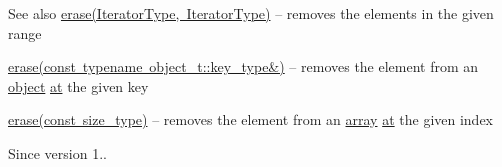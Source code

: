 \begin{DoxySeeAlso}{See also}
\mbox{\hyperlink{classnlohmann_1_1basic__json_a4b3f7eb2d4625d95a51fbbdceb7c5f39}{erase(\+Iterator\+Type, Iterator\+Type)}} -- removes the elements in the given range 

\mbox{\hyperlink{classnlohmann_1_1basic__json_a2f8484d69c55d8f2a9697a7bec29362a}{erase(const typename object\+\_\+t\+::key\+\_\+type\&)}} -- removes the element from an \mbox{\hyperlink{classnlohmann_1_1basic__json_a31f84ee15c4690ff705bed74736d04c6}{object}} \mbox{\hyperlink{classnlohmann_1_1basic__json_a73ae333487310e3302135189ce8ff5d8}{at}} the given key 

\mbox{\hyperlink{classnlohmann_1_1basic__json_a88cbcefe9a3f4d294bed0653550a5cb9}{erase(const size\+\_\+type)}} -- removes the element from an \mbox{\hyperlink{classnlohmann_1_1basic__json_a8a7d537fc297bbc5b845f92fe0445e3b}{array}} \mbox{\hyperlink{classnlohmann_1_1basic__json_a73ae333487310e3302135189ce8ff5d8}{at}} the given index
\end{DoxySeeAlso}
\begin{DoxySince}{Since}
version 1.. 
\end{DoxySince}
\mbox{\label{classnlohmann_1_1basic__json_a4b3f7eb2d4625d95a51fbbdceb7c5f39}} 
